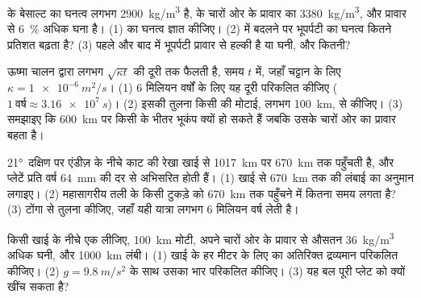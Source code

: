 \begin{exercise}[$\star\star$]\label{exo:g11:subduction-zones:11}
 के बेसाल्ट का घनत्व लगभग \qty{2900}{kg/m^3} है,
 के चारों ओर के प्रावार का \qty{3380}{kg/m^3}, और 
प्रावार से \qty{6}{\percent} अधिक घना है। (1)  का घनत्व ज्ञात कीजिए।
(2)  में बदलने पर भूपर्पटी का घनत्व कितने प्रतिशत
बढ़ता है? (3) पहले और बाद में भूपर्पटी प्रावार से हल्की है या घनी, और कितनी?
\end{exercise}

\begin{exercise}[$\star\star\star$]\label{exo:g11:subduction-zones:12}
ऊष्मा चालन द्वारा लगभग $\sqrt{\kappa t}$ की दूरी तक फैलती है,
समय $t$ में, जहाँ चट्टान के लिए $\kappa = \qty{1e-6}{m^2/s}$। (1) 6 मिलियन वर्षों के लिए यह दूरी
परिकलित कीजिए ($1~\text{वर्ष} \approx \qty{3.16e7}{s}$)। (2) इसकी तुलना
किसी  की मोटाई, लगभग \qty{100}{km}, से कीजिए। (3) समझाइए कि
\qty{600}{km} पर किसी  के भीतर भूकंप क्यों हो सकते हैं जबकि उसके चारों ओर का प्रावार
बहता है।
\end{exercise}

\begin{exercise}[$\star\star\star$]\label{exo:g11:subduction-zones:13}
\ang{21}~दक्षिण पर एंडीज़ के नीचे काट की रेखा खाई से \qty{1017}{km} पर
\qty{670}{km} तक पहुँचती है, और प्लेटें प्रति वर्ष
\qty{64}{mm} की दर से अभिसरित होती हैं। (1) खाई से \qty{670}{km} तक  की लंबाई का
अनुमान लगाइए। (2) महासागरीय तली के किसी टुकड़े को
\qty{670}{km} तक पहुँचने में कितना समय लगता है? (3) टोंगा से तुलना कीजिए, जहाँ यही यात्रा लगभग 6
मिलियन वर्ष लेती है।
\end{exercise}

\begin{exercise}[$\star\star\star$]\label{exo:g11:subduction-zones:14}
किसी खाई के नीचे एक  लीजिए, \qty{100}{km} मोटी, अपने चारों ओर के प्रावार से
औसतन \qty{36}{kg/m^3} अधिक घनी, और \qty{1000}{km} लंबी।
(1) खाई के हर मीटर के लिए  का अतिरिक्त द्रव्यमान परिकलित कीजिए। (2)
$g = \qty{9.8}{m/s^2}$ के साथ उसका भार परिकलित कीजिए। (3) यह बल पूरी
प्लेट को क्यों खींच सकता है?
\end{exercise}

